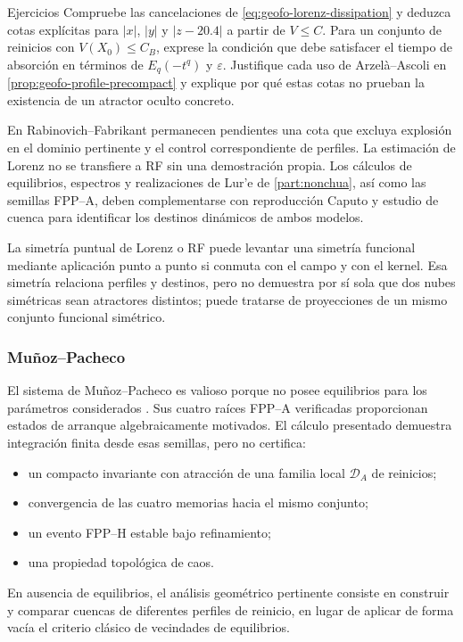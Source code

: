 \ifHAFOPedagogy
\begin{bloqueestudio}{Ejercicios}
Compruebe las cancelaciones de \cref{eq:geofo-lorenz-dissipation} y deduzca
cotas explícitas para \(|x|\), \(|y|\) y \(|z-20.4|\) a partir de
\(V\leq C\). Para un conjunto de reinicios con \(V(X_0)\leq C_B\),
exprese la condición que debe satisfacer el tiempo de absorción en términos
de \(E_q(-t^q)\) y \(\varepsilon\). Justifique cada uso de
Arzelà--Ascoli en \cref{prop:geofo-profile-precompact} y explique por qué
estas cotas no prueban la existencia de un atractor oculto concreto.
\end{bloqueestudio}
\fi

En Rabinovich--Fabrikant permanecen pendientes una cota que excluya explosión
en el dominio pertinente y el control correspondiente de perfiles. La
estimación de Lorenz no se transfiere a RF sin una demostración propia.
Los cálculos de equilibrios, espectros y realizaciones de Lur'e de
\cref{part:nonchua}, así como las semillas FPP--A, deben complementarse
con reproducción Caputo y estudio de cuenca para identificar los destinos
dinámicos de ambos modelos.

La simetría puntual de Lorenz o RF puede levantar una simetría funcional
mediante aplicación punto a punto si conmuta con el campo y con el kernel. Esa
simetría relaciona perfiles y destinos, pero no demuestra por sí sola que dos
nubes simétricas sean atractores distintos; puede tratarse de proyecciones de
un mismo conjunto funcional simétrico.

\subsubsection{Muñoz--Pacheco}

El sistema de Muñoz--Pacheco es valioso porque no posee equilibrios para los
parámetros considerados \cite{munoz2018}. Sus cuatro raíces FPP--A verificadas
proporcionan estados de arranque algebraicamente motivados. El cálculo
presentado demuestra integración finita desde esas semillas, pero no certifica:
\begin{itemize}
 \item un compacto invariante con atracción de una familia local
 \(\mathcal D_A\) de reinicios;
 \item convergencia de las cuatro memorias hacia el mismo conjunto;
 \item un evento FPP--H estable bajo refinamiento;
 \item una propiedad topológica de caos.
\end{itemize}
En ausencia de equilibrios, el análisis geométrico pertinente consiste en
construir y comparar cuencas de diferentes perfiles de reinicio, en lugar de
aplicar de forma vacía el criterio clásico de vecindades de equilibrios.

